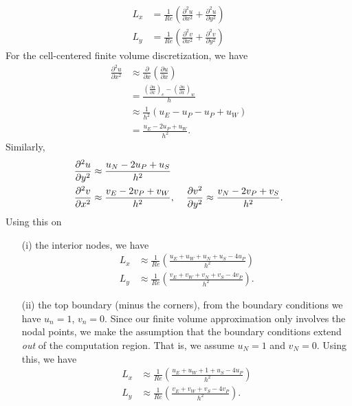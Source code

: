 \documentclass{article}
\begin{document}
\begin{itemize}
\begin{itemize}
        \begin{align*}
            L_x &= \frac{1}{Re}\left(\frac{\partial^2 u}{\partial x^2} + \frac{\partial^2 u}{\partial y^2}\right)\\
            L_y &= \frac{1}{Re}\left(\frac{\partial^2 v}{\partial x^2} + \frac{\partial^2 v}{\partial y^2}\right)
        \end{align*}
        For the cell-centered finite volume discretization, we have
        \begin{align*}
            \frac{\partial^2 u}{\partial x^2} &\approx \frac{\partial }{\partial x}\left(\frac{\partial u}{\partial x}\right)\\
            &= \frac{\left(\frac{\partial u}{\partial x}\right)_e - \left(\frac{\partial u}{\partial x}\right)_w}{h}\\
            &\approx \frac{1}{h^2} \left(u_E - u_P - u_P + u_W\right)\\
            &= \frac{u_E - 2u_P + u_W}{h^2}.
        \end{align*}
        Similarly, 
        \begin{align*}
            \frac{\partial^2 u}{\partial y^2} &\approx \frac{u_N - 2u_P + u_S}{h^2}\\
            \frac{\partial^2 v}{\partial x^2} &\approx \frac{v_E - 2v_P + v_W}{h^2}, \hspace{0.4cm} \frac{\partial v^2}{\partial y^2} \approx \frac{v_N - 2v_P + v_S}{h^2}.
        \end{align*}
        Using this on
        \begin{itemize}
            \item[(i)] the interior nodes, we have
            \begin{align*}
                L_x &\approx \frac{1}{Re}\left(\frac{u_E + u_W + u_N + u_S - 4u_P}{h^2}\right)\\
                L_y &\approx \frac{1}{Re}\left(\frac{v_E + v_W + v_N + v_S - 4v_P}{h^2}\right).
            \end{align*}

            \item[(ii)] the top boundary (minus the corners), from the boundary conditions we have $u_n = 1$, $v_n = 0$. Since our finite volume approximation only involves the nodal points, we make the assumption that the boundary conditions extend \textit{out} of the computation region. That is, we assume $u_N = 1$ and $v_N = 0$. Using this, we have
            \begin{align*}
                L_x &\approx \frac{1}{Re}\left(\frac{u_E + u_W + 1 + u_S - 4u_P}{h^2}\right)\\
                L_y &\approx \frac{1}{Re}\left(\frac{v_E + v_W + v_S - 4v_P}{h^2}\right).
            \end{align*}


\end{itemize}
\end{itemize}
\end{itemize}
\end{document}
